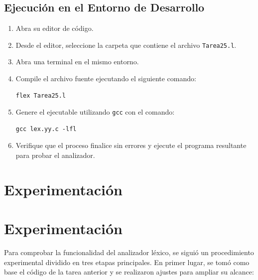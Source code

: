 \documentclass{article}
\begin{document}
\subsection*{Ejecución en el Entorno de Desarrollo}

\begin{enumerate}
    \item Abra su editor de código.
    \item Desde el editor, seleccione la carpeta que contiene el archivo \texttt{Tarea25.l}.
    \item Abra una terminal en el mismo entorno.
    \item Compile el archivo fuente ejecutando el siguiente comando:
    \begin{verbatim}
flex Tarea25.l
    \end{verbatim}
    \item Genere el ejecutable utilizando \texttt{gcc} con el comando:
    \begin{verbatim}
gcc lex.yy.c -lfl
    \end{verbatim}
    \item Verifique que el proceso finalice sin errores y ejecute el programa resultante para probar el analizador.
\end{enumerate}



\section{Experimentación}\label{sec:exp}

\section*{Experimentación}

Para comprobar la funcionalidad del analizador léxico, se siguió un procedimiento experimental dividido en tres etapas principales. En primer lugar, se tomó como base el código de la tarea anterior y se realizaron ajustes para ampliar su alcance:
\end{document}
